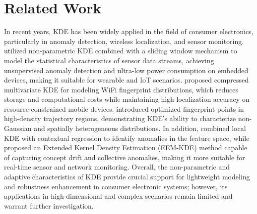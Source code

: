 \documentclass[conference]{IEEEtran}
\begin{document}
\section{Related Work}
In recent years, KDE has been widely applied in the field of consumer electronics, particularly in anomaly detection, wireless localization, and sensor monitoring.
\cite{shylendra2020low} utilized non-parametric KDE combined with a sliding window mechanism to model the statistical characteristics of sensor data streams, achieving unsupervised anomaly detection and ultra-low power consumption on embedded devices, making it suitable for wearable and IoT scenarios.
\cite{xu2020compressed} proposed compressed multivariate KDE for modeling WiFi fingerprint distributions, which reduces storage and computational costs while maintaining high localization accuracy on resource-constrained mobile devices.
\cite{yong2024kernel} introduced optimized fingerprint points in high-density trajectory regions, demonstrating KDE’s ability to characterize non-Gaussian and spatially heterogeneous distributions.
In addition, \cite{hu2018anomaly} combined local KDE with contextual regression to identify anomalies in the feature space, while \cite{rosenberger2022extended} proposed an Extended Kernel Density Estimation (EEM-KDE) method capable of capturing concept drift and collective anomalies, making it more suitable for real-time sensor and network monitoring.
Overall, the non-parametric and adaptive characteristics of KDE provide crucial support for lightweight modeling and robustness enhancement in consumer electronic systems; however, its applications in high-dimensional and complex scenarios remain limited and warrant further investigation.
\end{document}
